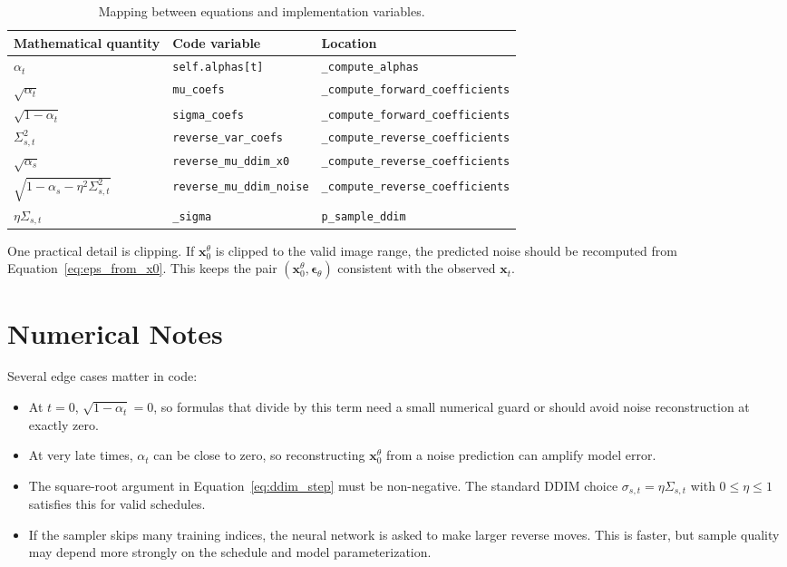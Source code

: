 \documentclass[11pt]{article}
\newcommand{\bx}{\mathbf{x}}
\newcommand{\beps}{\boldsymbol{\epsilon}}
\begin{document}
\begin{table}[h]
  \centering
  \caption{Mapping between equations and implementation variables.}
  \label{tab:implementation_mapping}
  \begin{tabular}{lll}
    \toprule
    Mathematical quantity & Code variable & Location \\
    \midrule
    $\alpha_t$ & \texttt{self.alphas[t]} & \texttt{\_compute\_alphas} \\
    $\sqrt{\alpha_t}$ & \texttt{mu\_coefs} & \texttt{\_compute\_forward\_coefficients} \\
    $\sqrt{1-\alpha_t}$ & \texttt{sigma\_coefs} & \texttt{\_compute\_forward\_coefficients} \\
    $\Sigma_{s,t}^2$ & \texttt{reverse\_var\_coefs} & \texttt{\_compute\_reverse\_coefficients} \\
    $\sqrt{\alpha_s}$ & \texttt{reverse\_mu\_ddim\_x0} & \texttt{\_compute\_reverse\_coefficients} \\
    $\sqrt{1-\alpha_s-\eta^2\Sigma_{s,t}^2}$ & \texttt{reverse\_mu\_ddim\_noise} & \texttt{\_compute\_reverse\_coefficients} \\
    $\eta\Sigma_{s,t}$ & \texttt{\_sigma} & \texttt{p\_sample\_ddim} \\
    \bottomrule
  \end{tabular}
\end{table}

One practical detail is clipping.  If $\bx_0^\theta$ is clipped to the valid image range, the predicted
noise should be recomputed from Equation~\eqref{eq:eps_from_x0}.  This keeps the pair
$(\bx_0^\theta,\beps_\theta)$ consistent with the observed $\bx_t$.

\section{Numerical Notes}

Several edge cases matter in code:
\begin{itemize}
  \item At $t=0$, $\sqrt{1-\alpha_t}=0$, so formulas that divide by this term need a small numerical
        guard or should avoid noise reconstruction at exactly zero.
  \item At very late times, $\alpha_t$ can be close to zero, so reconstructing $\bx_0^\theta$ from a
        noise prediction can amplify model error.
  \item The square-root argument in Equation~\eqref{eq:ddim_step} must be non-negative.  The standard
        DDIM choice $\sigma_{s,t}=\eta\Sigma_{s,t}$ with $0\leq\eta\leq1$ satisfies this for valid
        schedules.
  \item If the sampler skips many training indices, the neural network is asked to make larger reverse
        moves.  This is faster, but sample quality may depend more strongly on the schedule and model
        parameterization.
\end{itemize}
\end{document}
